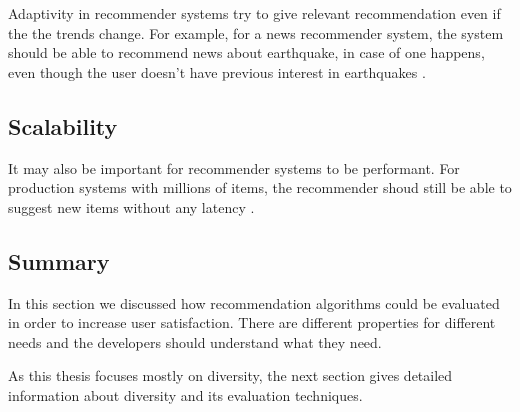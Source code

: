 Adaptivity in recommender systems try to give relevant recommendation even if the the trends change. For example, for a news recommender system, the system should be able to recommend news about earthquake, in case of one happens, even though the user doesn't have previous interest in earthquakes \cite{shani2011evaluating}.

\subsection{Scalability}

It may also be important for recommender systems to be performant. For production systems with millions of items, the recommender shoud still be able to suggest new items without any latency \cite{shani2011evaluating}.

\subsection{Summary}

In this section we discussed how recommendation algorithms could be evaluated in order to increase user satisfaction. There are different properties for different needs and the developers should understand what they need.

As this thesis focuses mostly on diversity, the next section gives detailed information about diversity and its evaluation techniques.

